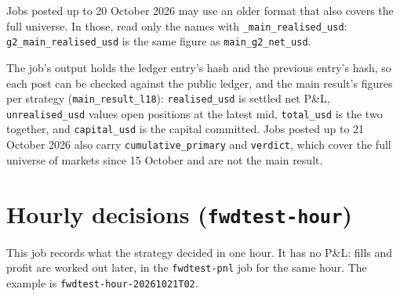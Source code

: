 \documentclass[11pt,a4paper]{article}
\newcommand{\job}[1]{\texttt{#1}}
\begin{document}
Jobs posted up to 20 October 2026 may use an older format that also covers the full universe. In those, read only
the names with
\job{\_main\_realised\_usd}: \job{g2\_main\_realised\_usd} is the same figure as \job{main\_g2\_net\_usd}.

The job's output holds the ledger entry's hash and the previous entry's hash, so each post can be checked against
the public ledger, and the main result's figures per strategy (\job{main\_result\_l18}): \job{realised\_usd} is settled
net P\&L, \job{unrealised\_usd} values open positions at the latest mid, \job{total\_usd} is the two together, and
\job{capital\_usd} is the capital committed. Jobs posted up to 21 October 2026 also carry \job{cumulative\_primary} and
\job{verdict}, which cover the full universe of markets since 15 October and are not the main result.

\section*{Hourly decisions (\job{fwdtest-hour})}

This job records what the strategy decided in one hour. It has no P\&L: fills and profit are worked out later, in the
\job{fwdtest-pnl} job for the same hour. The example is \job{fwdtest-hour-20261021T02}.
\end{document}
